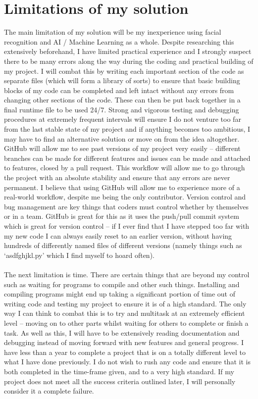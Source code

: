 \documentclass[9pt]{article}
\begin{document}
\section{Limitations of my solution}\label{sec_limitations}
The main limitation of my solution will be my inexperience using facial recognition and AI / Machine Learning as a whole. Despite researching this extensively beforehand, I have limited practical experience and I strongly suspect there to be many errors along the way during the coding and practical building of my project. I will combat this by writing each important section of the code as separate files (which will form a library of sorts) to ensure that basic building blocks of my code can be completed and left intact without any errors from changing other sections of the code. These can then be put back together in a final runtime file to be used 24/7. Strong and vigorous testing and debugging procedures at extremely frequent intervals will ensure I do not venture too far from the last stable state of my project and if anything becomes too ambitious, I may have to find an alternative solution or move on from the idea altogether.
GitHub will allow me to see past versions of my project very easily – different branches can be made for different features and issues can be made and attached to features, closed by a pull request. This workflow will allow me to go through the project with an absolute stability and ensure that any errors are never permanent. I believe that using GitHub will allow me to experience more of a real-world workflow, despite me being the only contributor. Version control and bug management are key things that coders must control whether by themselves or in a team. GitHub is great for this as it uses the push/pull commit system which is great for version control – if I ever find that I have stepped too far with my new code I can always easily reset to an earlier version, without having hundreds of differently named files of different versions (namely things such as ‘asdfghjkl.py’ which I find myself to hoard often).\\\\
The next limitation is time. There are certain things that are beyond my control such as waiting for programs to compile and other such things. Installing and compiling programs might end up taking a significant portion of time out of writing code and testing my project to ensure it is of a high standard. The only way I can think to combat this is to try and multitask at an extremely efficient level – moving on to other parts whilst waiting for others to complete or finish a task. As well as this, I will have to be extensively reading documentation and debugging instead of moving forward with new features and general progress. I have less than a year to complete a project that is on a totally different level to what I have done previously. I do not wish to rush any code and ensure that it is both completed in the time-frame given, and to a very high standard. If my project does not meet all the success criteria outlined later, I will personally consider it a complete failure.\\\\
\end{document}
